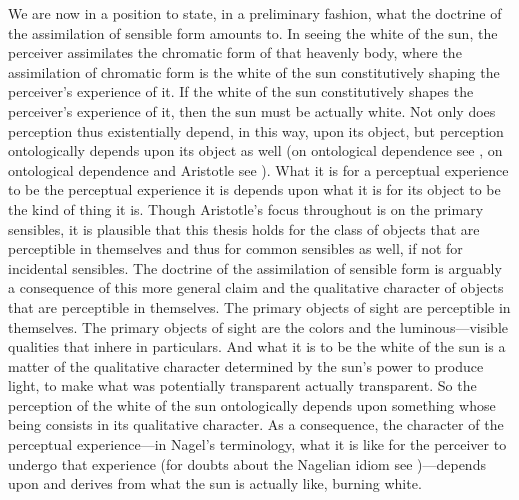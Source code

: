 We are now in a position to state, in a preliminary fashion, what the doctrine of the assimilation of sensible form amounts to. In seeing the white of the sun, the perceiver assimilates the chromatic form of that heavenly body, where the assimilation of chromatic form is the white of the sun constitutively shaping the perceiver's experience of it. If the white of the sun constitutively shapes the perceiver's experience of it, then the sun must be actually white. Not only does perception thus existentially depend, in this way, upon its object, but perception ontologically depends upon its object as well (on ontological dependence see \citealt{Fine:1995ls}, on ontological dependence and Aristotle see \citealt{Peramatzis:2011aa}). What it is for a perceptual experience to be the perceptual experience it is depends upon what it is for its object to be the kind of thing it is. Though Aristotle's focus throughout is on the primary sensibles, it is plausible that this thesis holds for the class of objects that are perceptible in themselves and thus for common sensibles as well, if not for incidental sensibles. The doctrine of the assimilation of sensible form is arguably a consequence of this more general claim and the qualitative character of objects that are perceptible in themselves. The primary objects of sight are perceptible in themselves. The primary objects of sight are the colors and the luminous---visible qualities that inhere in particulars. And what it is to be the white of the sun is a matter of the qualitative character determined by the sun's power to produce light, to make what was potentially transparent actually transparent. So the perception of the white of the sun ontologically depends upon something whose being consists in its qualitative character.  As a consequence, the character of the perceptual experience---in Nagel's \citeyearpar{Nagel:1979fk} terminology, what it is like for the perceiver to undergo that experience (for doubts about the Nagelian idiom see \citealt{Snowdon:2010ap})---depends upon and derives from what the sun is actually like, burning white. 

